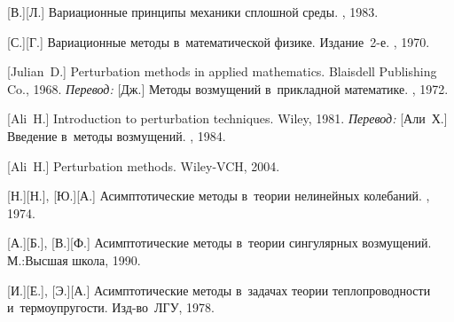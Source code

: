 \begin{thebibliography}{123}
\begin{otherlanguage}{russian}
[В.][Л.] Вариационные принципы механики сплошной среды. \naukapublisher, 1983. 

[С.][Г.] Вариационные методы в~математической физике. Издание~2\hbox{-}е. \naukapublisher, 1970. 

%
%



[Julian~D.] Perturbation methods in applied mathematics. Blaisdell Publishing Co., 1968. 
\emph{Перевод:} [Дж.] Методы возмущений в~прикладной математике. \mirpublisher, 1972. 

[Ali~H.] Introduction to perturbation techniques. Wiley, 1981. 
\emph{Перевод:} [Али~Х.] Введение в~методы возмущений. \mirpublisher, 1984. 

[Ali~H.] Perturbation methods. Wiley-VCH, 2004. 

[Н.][Н.], [Ю.][А.] Асимптотические методы в~теории нелинейных колебаний. \naukapublisher, 1974. 

[А.][Б.], [В.][Ф.] Асимптотические методы в~теории сингулярных возмущений. М.:\;Высшая школа, 1990. 

[И.][Е.], %
[Э.][А.] %
Асимптотические методы в~задачах теории теплопроводности и~термоупругости. Изд\hbox{-}во~ЛГУ, 1978. 


\end{otherlanguage}
\end{thebibliography}
